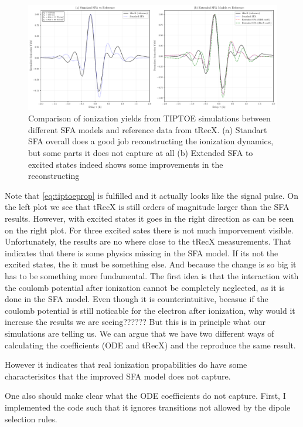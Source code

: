\begin{figure}
    \centering
    \includegraphics[width=1\textwidth]{../ionModel/python/plotsTIPTOE/2plot_SFA-comparison_1.pdf}
    \caption{Comparison of ionization yields from TIPTOE simulations between different SFA models and reference data from tRecX. 
            (a) Standart SFA overall does a good job reconstructing the ionization dynamics, but some parts it does not capture at all 
            (b) Extended SFA to excited states indeed shows some improvements in the reconstructing }
    \label{fig:tiptoe_sfa_comparison}
\end{figure}
Note that \eqref{eq:tiptoeprop} is fulfilled and it actually looks like the signal pulse.
On the left plot we see that tRecX is still orders of magnitude larger than the SFA results. 
However, with excited states it goes in the right direction as can be seen on the right plot. 
For three excited sates there is not much imporvement visible.
Unfortunately, the results are no where close to the tRecX measurements. That indicates that there is some physics missing in the SFA model.
If its not the excited states, the it must be something else.
And because the change is so big it has to be something more fundamental.
The first idea is that the interaction with the coulomb potential after ionization cannot be completely neglected, as it is done in the SFA model.
Even though it is counterintuitive, becasue if the coulomb potential is still noticable for the electron after ionization, why would it increase the results we are seeing??????
But this is in principle what our simulations are telling us. We can argue that we have two different ways of calculating the coefficients (ODE and tRecX) and the reproduce the same result.

However it indicates that real ionization propabilities do have some characterisitcs that the improved SFA model does not capture.

One also should make clear what the ODE coefficients do not capture. First, I implemented the code such that it ignores transitions not allowed by the dipole selection rules.

